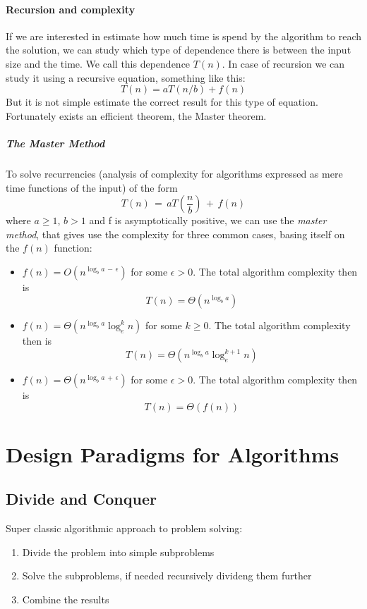 \documentclass{article}
\begin{document}
			\paragraph{Recursion and complexity}
			If we are interested in estimate how much time is spend by the algorithm to reach the solution, we can study which type of dependence there is between the input size and the time. We call this dependence $T(n)$.
			In case of recursion we can study it using a recursive equation, something like this:
			$$T(n) = a T(n/b) + f(n)$$
			But it is not simple estimate the correct result for this type of equation. Fortunately exists an efficient theorem, the Master theorem.

			\subparagraph{The Master Method}
				To solve recurrencies (analysis of complexity for algorithms expressed as mere time functions of the input) of the form
				\begin{equation}
					T(n)\, =\, aT(\frac{n}{b})\, +\, f(n)
				\end{equation}
				where $a \geq 1$, $b > 1$ and f is asymptotically positive, we can use the \textit{master method}, that gives use the complexity for three common cases, basing itself on the $f(n)$ function:
				\begin{itemize}
					\item $f(n) = O(n^{\log_ba\, -\, \epsilon})$ for some $\epsilon > 0$. The total algorithm complexity then is
						\begin{equation}
							T(n) = \Theta(n^{\log_ba})
						\end{equation}
					\item $f(n) = \Theta(n^{\log_ba} \log_e^kn)$ for some $k \geq 0$. The total algorithm complexity then is
						\begin{equation}
							T(n) = \Theta(n^{\log_ba} \log_e^{k+1}n)
						\end{equation}
					\item $f(n) = \Theta(n^{\log_ba\, +\, \epsilon})$ for some $\epsilon > 0$. The total algorithm complexity then is
						\begin{equation}
							T(n) = \Theta(f(n))
						\end{equation}
				\end{itemize}

	\section{Design Paradigms for Algorithms}
		\subsection{Divide and Conquer}
			Super classic algorithmic approach to problem solving:
			\begin{enumerate}
				\item Divide the problem into simple subproblems
				\item Solve the subproblems, if needed recursively divideng them further
				\item Combine the results
			\end{enumerate}
\end{document}
